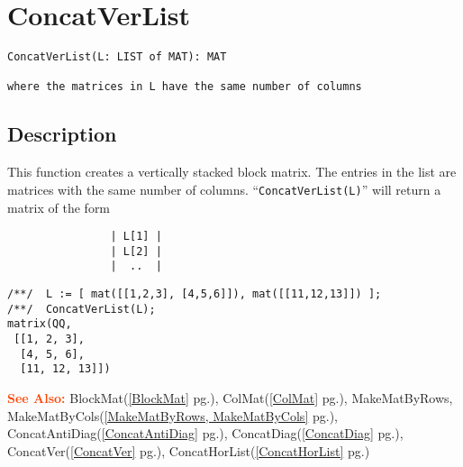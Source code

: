 \documentclass[a4paper]{mybook}
\newenvironment{command}{}{} %
\newcommand\SeeAlso{\par\textcolor{OrangeRed}{\textbf{\large See Also: }}}
\begin{document}
\section{ConcatVerList}
\label{ConcatVerList}
\begin{command} %


\begin{Verbatim}[label=syntax, rulecolor=\color{MidnightBlue},
frame=single]
ConcatVerList(L: LIST of MAT): MAT

where the matrices in L have the same number of columns
\end{Verbatim}


\subsection*{Description}

This function creates a vertically stacked block matrix.  The
entries in the list are matrices with the same number of columns.
``\verb&ConcatVerList(L)&'' will return a matrix of the form
\begin{verbatim}
                | L[1] |
                | L[2] |
                |  ..  |
\end{verbatim}
\begin{Verbatim}[label=example, rulecolor=\color{PineGreen}, frame=single]
/**/  L := [ mat([[1,2,3], [4,5,6]]), mat([[11,12,13]]) ];
/**/  ConcatVerList(L);
matrix(QQ,
 [[1, 2, 3],
  [4, 5, 6],
  [11, 12, 13]])
\end{Verbatim}


\SeeAlso %
  BlockMat(\ref{BlockMat} pg.\pageref{BlockMat}), 
    ColMat(\ref{ColMat} pg.\pageref{ColMat}), 
    MakeMatByRows, MakeMatByCols(\ref{MakeMatByRows, MakeMatByCols} pg.\pageref{MakeMatByRows, MakeMatByCols}), 
    ConcatAntiDiag(\ref{ConcatAntiDiag} pg.\pageref{ConcatAntiDiag}), 
    ConcatDiag(\ref{ConcatDiag} pg.\pageref{ConcatDiag}), 
    ConcatVer(\ref{ConcatVer} pg.\pageref{ConcatVer}), 
    ConcatHorList(\ref{ConcatHorList} pg.\pageref{ConcatHorList})
\end{command} %
\end{document}
